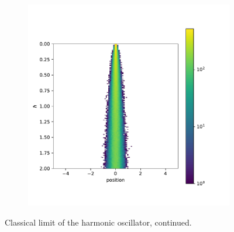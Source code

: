 \documentclass{scrartcl}
\begin{document}
\begin{figure}[H]
\begin{subfigure}[c]{0.32\textwidth}
				\label{fig:harmonic_oscillator_10_classical_limit_continued}
			\end{subfigure}
			\begin{subfigure}[c]{0.32\textwidth}
				\includegraphics[width=\textwidth]{../imgs/harmonic_oscillator_classical_limit/harmonic_oscillator_100_classical_limit.pdf}
				\label{fig:harmonic_oscillator_100_classical_limit_continued}
			\end{subfigure}
		\caption{Classical limit of the harmonic oscillator, continued.}
		\label{fig:track_1000100_virial}
	\end{figure}
\end{document}
